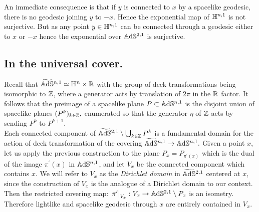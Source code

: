 An immediate consequence is that if $y$ is connected to $x$ by a spacelike geodesic, there is no geodesic joining $y$ to $-x$. Hence the exponential map of $\mathbb{H}^{n,1}$ is not surjective. But as any point $y\in\mathbb{H}^{n,1}$ can be connected through a geodesic either to $x$ or $-x$ hence the exponential over $\mathbb{A}\mathrm{d}\mathbb{S}^{2,1}$ is surjective.
\subsection{In the universal cover.}
Recall that $\widetilde{\mathbb{A}\mathrm{d}\mathbb{S}}{}^{n,1}\simeq \mathbb{H}^n\times\mathbb{R}$ with the group of deck transformations being isomorphic to $\mathbb{Z}$, where a generator acts by translation of $2\pi$ in the $\mathbb{R}$ factor. It follows that the preimage of a spacelike plane $P\subset\mathbb{A}\mathrm{d}\mathbb{S}^{n,1}$ is the disjoint union of spacelike planes $(P^k)_{k\in\mathbb{Z}},$ enumerated so that the generator $\eta$ of $\mathbb{Z}$ acts by sending $P^k$ to $P^{k+1}.$ \\
Each connected component of $\widetilde{\mathbb{A}\mathrm{d}\mathbb{S}}{}^{2,1}\setminus\bigcup_{k\in\mathbb{Z}} P^k$ is a fundamental domain for the action of deck transformation of the covering $\widetilde{\mathbb{A}\mathrm{d}\mathbb{S}}{}^{n,1}\to\mathbb{A}\mathrm{d}\mathbb{S}^{n,1}.$ Given a point $x$, let us apply the previous construction to the plane $P_x=P_{\pi^{\prime}(x)}$ which is the dual of the image $\pi^{\prime}(x)$ in $\mathbb{A}\mathrm{d}\mathbb{S}^{n,1}$, and let $V_x$ be the connected component which contains $x$. We will refer to $V_x$ as the \textit{Dirichlet domain} in $\widetilde{\mathbb{A}\mathrm{d}\mathbb{S}}{}^{2,1}$ centered at $x$, since the construction of $V_x$ is the analogue of a Dirichlet domain to our context. Then the restricted covering map: $\left.\pi^{\prime}\right|_{V_x}:V_x\to\mathbb{A}\mathrm{d}\mathbb{S}^{2,1}\setminus P_x$ is an isometry. Therefore lightlike and spacelike geodesic through $x$ are entirely contained in $V_x$.\\ 